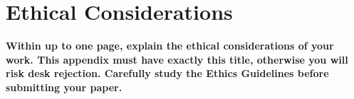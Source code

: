 \section*{Ethical Considerations}
\textbf{Within up to one page, explain the ethical considerations of your work. This appendix must have exactly this title, otherwise you will risk desk rejection. Carefully study the Ethics Guidelines before submitting your paper.}